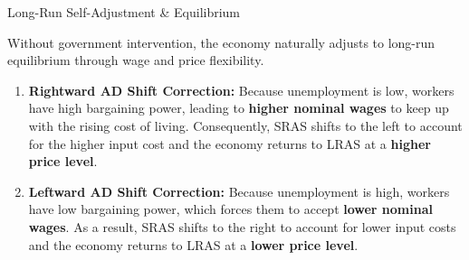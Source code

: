 \documentclass[10pt]{article}
\begin{document}
    \begin{core}{Long-Run Self-Adjustment \& Equilibrium}

      Without government intervention, the economy naturally adjusts to long-run equilibrium through wage and price flexibility.
      
      \begin{enumerate}

        \item \textbf{Rightward AD Shift Correction:} Because unemployment is low, workers have high bargaining power, leading to \textbf{higher nominal wages} to keep up with the rising cost of living. Consequently, SRAS shifts to the left to account for the higher input cost and the economy returns to LRAS at a \textbf{higher price level}.


        \item \textbf{Leftward AD Shift Correction:} Because unemployment is high, workers have low bargaining power, which forces them to accept \textbf{lower nominal wages}. As a result, SRAS shifts to the right to account for lower input costs and the economy returns to LRAS at a \textbf{lower price level}.


\end{enumerate}
\end{core}
\end{document}
